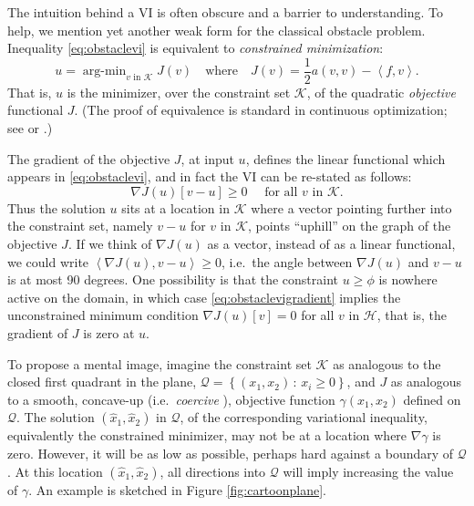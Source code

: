 \documentclass[letterpaper,final,12pt,reqno]{amsart}
\newcommand{\ip}[2]{\left<#1,#2\right>}
\begin{document}
The intuition behind a VI is often obscure and a barrier to understanding.  To help, we mention yet another weak form for the classical obstacle problem.  Inequality \eqref{eq:obstaclevi} is equivalent to \emph{constrained minimization}:
\newcommand{\argmin}{\mathop{\mathrm{arg\text{-}min}}}
\begin{equation}
  u = \argmin_{v \text{ in } \mathcal{K}} J(v) \quad \text{where} \quad J(v) = \frac{1}{2} a(v,v) - \ip{f}{v}. \label{eq:obstaclemin}
\end{equation}
That is, $u$ is the minimizer, over the constraint set $\mathcal{K}$, of the quadratic \emph{objective} functional $J$.  (The proof of equivalence is standard in continuous optimization; see \cite{KinderlehrerStampacchia1980} or \cite[Chapter 12]{Bueler2021}.)

The gradient of the objective $J$, at input $u$, defines the linear functional which appears in \eqref{eq:obstaclevi}, and in fact the VI can be re-stated as follows:
\begin{equation}
  \nabla J(u)[v-u] \ge 0 \quad \text{ for all } v \text{ in } \mathcal{K}. \label{eq:obstaclevigradient}
\end{equation}
Thus the solution $u$ sits at a location in $\mathcal{K}$ where a vector pointing further into the constraint set, namely $v-u$ for $v$ in $\mathcal{K}$, points ``uphill'' on the graph of the objective $J$.  If we think of $\nabla J(u)$ as a vector, instead of as a linear functional, we could write $\ip{\nabla J(u)}{v-u} \ge 0$, i.e.~the angle between $\nabla J(u)$ and $v-u$ is at most 90 degrees.  One possibility is that the constraint $u\ge \phi$ is nowhere active on the domain, in which case \eqref{eq:obstaclevigradient} implies the unconstrained minimum condition $\nabla J(u)[v] = 0$ for all $v$ in $\mathcal{H}$, that is, the gradient of $J$ is zero at $u$.

To propose a mental image, imagine the constraint set $\mathcal{K}$ as analogous to the closed first quadrant in the plane, $\mathcal{Q} = \left\{(x_1,x_2)\,:\,x_i\ge 0\right\}$, and $J$ as analogous to a smooth, concave-up (i.e.~\emph{coercive} \cite{Evans2010}), objective function $\gamma(x_1,x_2)$ defined on $\mathcal{Q}$.  The solution $(\hat x_1,\hat x_2)$ in $\mathcal{Q}$, of the corresponding variational inequality, equivalently the constrained minimizer, may not be at a location where $\nabla \gamma$ is zero.  However, it will be as low as possible, perhaps hard against a boundary of $\mathcal{Q}$.  At this location $(\hat x_1,\hat x_2)$, all directions into $\mathcal{Q}$ will imply increasing the value of $\gamma$.  An example is sketched in Figure \ref{fig:cartoonplane}.
\end{document}

